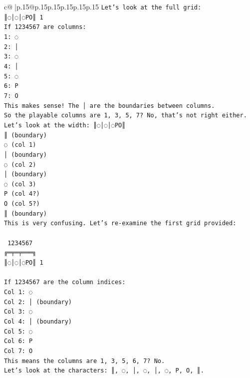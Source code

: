 \documentclass{article}
\begin{document}
{\begin{supertabular}{c@{$\;$}|p{.15\linewidth}@{}p{.15\linewidth}p{.15\linewidth}p{.15\linewidth}p{.15\linewidth}p{.15\linewidth}}
{{{\texttt{Let's look at the full grid:} \\
\texttt{║◌│◌│◌PO║ 1} \\
\texttt{If 1234567 are columns:} \\
\texttt{1: ◌} \\
\texttt{2: │} \\
\texttt{3: ◌} \\
\texttt{4: │} \\
\texttt{5: ◌} \\
\texttt{6: P} \\
\texttt{7: O} \\
\texttt{This makes sense! The │ are the boundaries between columns.} \\
\texttt{So the playable columns are 1, 3, 5, 7? No, that's not right either.} \\
\texttt{Let's look at the width: ║◌│◌│◌PO║} \\
\texttt{║ (boundary)} \\
\texttt{◌ (col 1)} \\
\texttt{│ (boundary)} \\
\texttt{◌ (col 2)} \\
\texttt{│ (boundary)} \\
\texttt{◌ (col 3)} \\
\texttt{P (col 4?)} \\
\texttt{O (col 5?)} \\
\texttt{║ (boundary)} \\
\texttt{This is very confusing. Let's re{-}examine the first grid provided:} \\
\\ 
\texttt{ 1234567} \\
\texttt{╔═╤═╤═══╗} \\
\texttt{║◌│◌│◌PO║ 1} \\
\\ 
\texttt{If 1234567 are the column indices:} \\
\texttt{Col 1: ◌} \\
\texttt{Col 2: │ (boundary)} \\
\texttt{Col 3: ◌} \\
\texttt{Col 4: │ (boundary)} \\
\texttt{Col 5: ◌} \\
\texttt{Col 6: P} \\
\texttt{Col 7: O} \\
\texttt{This means the columns are 1, 3, 5, 6, 7? No.} \\
\texttt{Let's look at the characters: ║, ◌, │, ◌, │, ◌, P, O, ║.} \\
}}}
\end{supertabular}}
\end{document}
